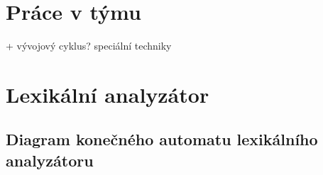 \documentclass[a4paper, 12pt]{article}
\begin{document}
\tableofcontents
\newpage
\section{Práce v týmu}
+ vývojový cyklus? speciální techniky
\section{Lexikální analyzátor} \label{lexer}
\subsection{Diagram konečného automatu lexikálního analyzátoru}

\end{document}
